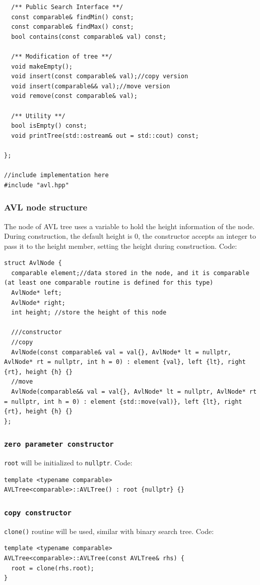 \documentclass[11pt]{book}
\begin{document}
\begin{verbatim}
  /** Public Search Interface **/
  const comparable& findMin() const;
  const comparable& findMax() const;
  bool contains(const comparable& val) const;

  /** Modification of tree **/
  void makeEmpty();
  void insert(const comparable& val);//copy version
  void insert(comparable&& val);//move version
  void remove(const comparable& val);

  /** Utility **/
  bool isEmpty() const;
  void printTree(std::ostream& out = std::cout) const;

};

//include implementation here 
#include "avl.hpp"
\end{verbatim}

\subsubsection{AVL node structure}
\label{sec:org4fd27b1}
The node of AVL tree uses a variable to hold the height information of the node. During construction, the default height is 0, the constructor accepts an integer to pass it to the height member, setting the height during construction. Code:
\begin{verbatim}
struct AvlNode {
  comparable element;//data stored in the node, and it is comparable (at least one comparable routine is defined for this type)
  AvlNode* left;
  AvlNode* right;
  int height; //store the height of this node

  ///constructor
  //copy
  AvlNode(const comparable& val = val{}, AvlNode* lt = nullptr, AvlNode* rt = nullptr, int h = 0) : element {val}, left {lt}, right {rt}, height {h} {}
  //move
  AvlNode(comparable&& val = val{}, AvlNode* lt = nullptr, AvlNode* rt = nullptr, int h = 0) : element {std::move(val)}, left {lt}, right {rt}, height {h} {}
};
\end{verbatim}
\subsubsection{\texttt{zero parameter constructor}}
\label{sec:orgc02b40a}
\texttt{root} will be initialized to \texttt{nullptr}. Code:
\begin{verbatim}
template <typename comparable>
AVLTree<comparable>::AVLTree() : root {nullptr} {}
\end{verbatim}
\subsubsection{\texttt{copy constructor}}
\label{sec:org6eaf9f0}
\texttt{clone()} routine will be used, similar with binary search tree. Code:
\begin{verbatim}
template <typename comparable>
AVLTree<comparable>::AVLTree(const AVLTree& rhs) {
  root = clone(rhs.root);
}
\end{verbatim}
\end{document}
